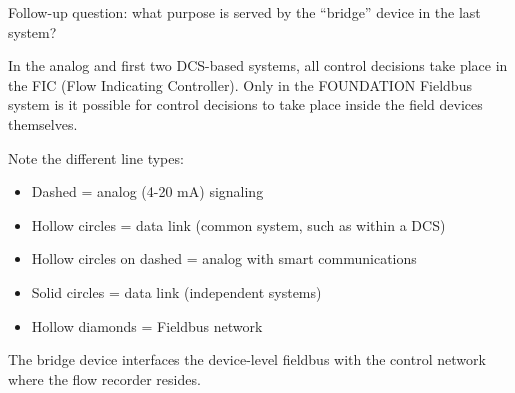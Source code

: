 \vskip 10pt

Follow-up question: what purpose is served by the ``bridge'' device in the last system?







In the analog and first two DCS-based systems, all control decisions take place in the FIC (Flow Indicating Controller).  Only in the FOUNDATION Fieldbus system is it possible for control decisions to take place inside the field devices themselves.

\vskip 10pt

Note the different line types: 

\begin{itemize}
\item{} Dashed = analog (4-20 mA) signaling
\item{} Hollow circles = data link (common system, such as within a DCS)
\item{} Hollow circles on dashed = analog with smart communications
\item{} Solid circles = data link (independent systems)
\item{} Hollow diamonds = Fieldbus network
\end{itemize}

\vskip 10pt

The bridge device interfaces the device-level fieldbus with the control network where the flow recorder resides.




